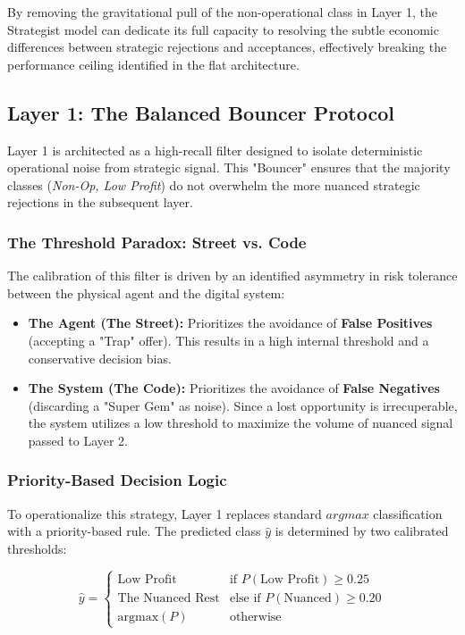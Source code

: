By removing the gravitational pull of the non-operational class in Layer 1, the Strategist model can dedicate its full capacity to resolving the subtle economic differences between strategic rejections and acceptances, effectively breaking the performance ceiling identified in the flat architecture.

\subsection{Layer 1: The Balanced Bouncer Protocol}
Layer 1 is architected as a high-recall filter designed to isolate deterministic operational noise from strategic signal. This "Bouncer" ensures that the majority classes (\textit{Non-Op, Low Profit}) do not overwhelm the more nuanced strategic rejections in the subsequent layer.

\subsubsection{The Threshold Paradox: Street vs. Code}
The calibration of this filter is driven by an identified asymmetry in risk tolerance between the physical agent and the digital system:

\begin{itemize}[noitemsep, topsep=3pt]
    \item \textbf{The Agent (The Street):} Prioritizes the avoidance of \textbf{False Positives} (accepting a "Trap" offer). This results in a high internal threshold and a conservative decision bias.
    \item \textbf{The System (The Code):} Prioritizes the avoidance of \textbf{False Negatives} (discarding a "Super Gem" as noise). Since a lost opportunity is irrecuperable, the system utilizes a low threshold to maximize the volume of nuanced signal passed to Layer 2.
\end{itemize}

\subsubsection{Priority-Based Decision Logic}
To operationalize this strategy, Layer 1 replaces standard $argmax$ classification with a priority-based rule. The predicted class $\hat{y}$ is determined by two calibrated thresholds:

\begin{equation}
\hat{y} = 
\begin{cases} 
\text{Low Profit} & \text{if } P(\text{Low Profit}) \ge 0.25 \\
\text{The Nuanced Rest} & \text{else if } P(\text{Nuanced}) \ge 0.20 \\
\text{argmax}(P) & \text{otherwise}
\end{cases}
\end{equation}

